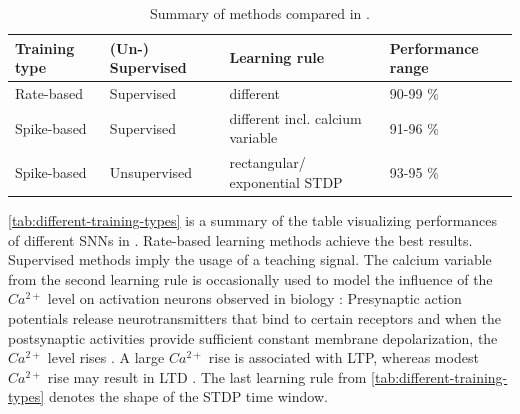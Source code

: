 \begin{table}[]
    \begin{tabular}{|l|l|l|l|}
    \hline
    \textbf{Training type} & \textbf{(Un-) Supervised}    & \textbf{Learning rule}               & \textbf{Performance range} \\ \hline
    Rate-based             & Supervised                   & different                            & 90-99 \%                   \\ \hline
    Spike-based            & Supervised                   & different incl. calcium variable & 91-96 \%                   \\ \hline
    Spike-based            & Unsupervised                 & rectangular/ exponential \ac{STDP}        & 93-95 \%                   \\ \hline
    \end{tabular}
    \caption{Summary of methods compared in \cite{SNN}.}
    \label{tab:different-training-types}
\end{table}

\autoref{tab:different-training-types} is a summary of the table visualizing performances of different \acp{SNN} in \cite{SNN}.
Rate-based learning methods achieve the best results.
Supervised methods imply the usage of a teaching signal.
The calcium variable from the second learning rule is occasionally used to model the influence of the $Ca^{2+}$ level on activation neurons observed in biology \cite{STDP_hebbian}:
Presynaptic action potentials release neurotransmitters that bind to certain receptors and 
when the postsynaptic activities provide sufficient constant membrane depolarization, the $Ca^{2+}$ level rises \cite{Synaptic_plasticity}.
A large $Ca^{2+}$ rise is associated with \ac{LTP}, whereas modest $Ca^{2+}$ rise may result in \ac{LTD} \cite{STDP_hebbian}.
The last learning rule from \autoref{tab:different-training-types} denotes the shape of the \ac{STDP} time window.